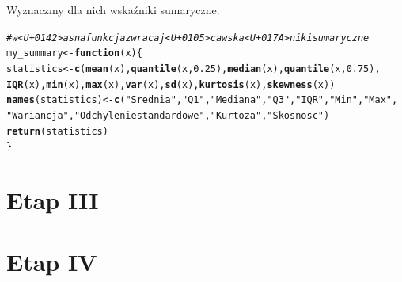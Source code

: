 \documentclass{article}\usepackage[]{graphicx}\usepackage[]{color}
\makeatletter
\newcommand{\hlnum}[1]{\textcolor[rgb]{0.686,0.059,0.569}{#1}}%
\newcommand{\hlstr}[1]{\textcolor[rgb]{0.192,0.494,0.8}{#1}}%
\newcommand{\hlcom}[1]{\textcolor[rgb]{0.678,0.584,0.686}{\textit{#1}}}%
\newcommand{\hlstd}[1]{\textcolor[rgb]{0.345,0.345,0.345}{#1}}%
\newcommand{\hlkwa}[1]{\textcolor[rgb]{0.161,0.373,0.58}{\textbf{#1}}}%
\newcommand{\hlkwb}[1]{\textcolor[rgb]{0.69,0.353,0.396}{#1}}%
\newcommand{\hlkwc}[1]{\textcolor[rgb]{0.333,0.667,0.333}{#1}}%
\newcommand{\hlkwd}[1]{\textcolor[rgb]{0.737,0.353,0.396}{\textbf{#1}}}%
\newenvironment{kframe}{%
 \def\at@end@of@kframe{}%
 \ifinner\ifhmode%
  \def\at@end@of@kframe{\end{minipage}}%
  \begin{minipage}{\columnwidth}%
 \fi\fi%
 \def\FrameCommand##1{\hskip\@totalleftmargin \hskip-\fboxsep
 \colorbox{shadecolor}{##1}\hskip-\fboxsep
     \hskip-\linewidth \hskip-\@totalleftmargin \hskip\columnwidth}%
 \MakeFramed {\advance\hsize-\width
   \@totalleftmargin\z@ \linewidth\hsize
   \@setminipage}}%
 {\par\unskip\endMakeFramed%
 \at@end@of@kframe}
\newenvironment{knitrout}{}{} %
\makeatother
\begin{document}
Wyznaczmy dla nich wskaźniki sumaryczne.

\begin{knitrout}
\color{fgcolor}\begin{kframe}
\begin{alltt}
\hlcom{# w<U+0142>asna funkcja zwracaj<U+0105>ca wska<U+017A>niki sumaryczne}
\hlstd{my_summary} \hlkwb{<-} \hlkwa{function}\hlstd{(}\hlkwc{x}\hlstd{) \{}
  \hlstd{statistics} \hlkwb{<-} \hlkwd{c}\hlstd{(}\hlkwd{mean}\hlstd{(x),} \hlkwd{quantile}\hlstd{(x,} \hlnum{0.25}\hlstd{),} \hlkwd{median}\hlstd{(x),} \hlkwd{quantile}\hlstd{(x,} \hlnum{0.75}\hlstd{),}
                  \hlkwd{IQR}\hlstd{(x),} \hlkwd{min}\hlstd{(x),} \hlkwd{max}\hlstd{(x),} \hlkwd{var}\hlstd{(x),} \hlkwd{sd}\hlstd{(x),} \hlkwd{kurtosis}\hlstd{(x),} \hlkwd{skewness}\hlstd{(x))}
  \hlkwd{names}\hlstd{(statistics)} \hlkwb{<-} \hlkwd{c}\hlstd{(}\hlstr{"Srednia"}\hlstd{,} \hlstr{"Q1"}\hlstd{,} \hlstr{"Mediana"}\hlstd{,} \hlstr{"Q3"}\hlstd{,} \hlstr{"IQR"}\hlstd{,} \hlstr{"Min"}\hlstd{,} \hlstr{"Max"}\hlstd{,}
                         \hlstr{"Wariancja"}\hlstd{,} \hlstr{"Odchylenie standardowe"}\hlstd{,} \hlstr{"Kurtoza"}\hlstd{,} \hlstr{"Skosnosc"}\hlstd{)}
  \hlkwd{return}\hlstd{(statistics)}
\hlstd{\}}
\end{alltt}
\end{kframe}
\end{knitrout}

\begin{table}[!h]

\caption{\label{tab:tabela_2}Wskazniki sumaryczne dla wybranych zmiennych}
\centering
{}
\end{table}



\section{Etap III}


\section{Etap IV}
\end{document}
